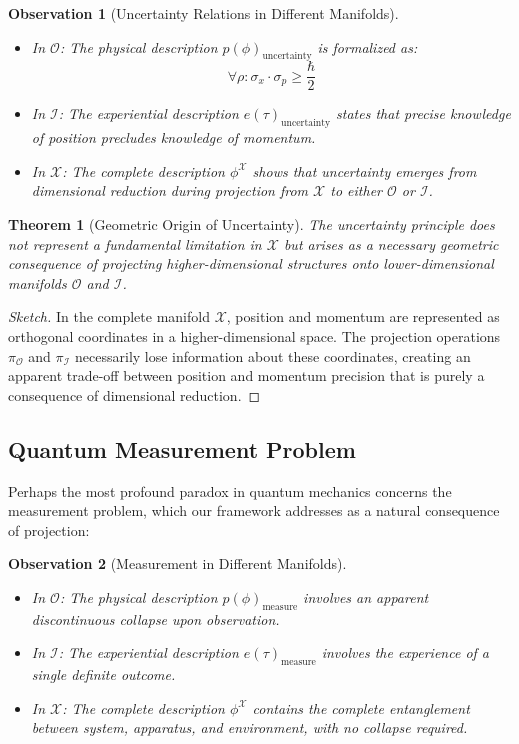 \documentclass{article}
\newtheorem{theorem}{Theorem}
\newtheorem{observation}{Observation}
\begin{document}
\begin{observation}[Uncertainty Relations in Different Manifolds]
\begin{itemize}
\item In $\mathcal{O}$: The physical description $p(\phi)_\text{uncertainty}$ is formalized as:
\begin{equation}
\forall \rho: \sigma_x \cdot \sigma_p \geq \frac{\hbar}{2}
\end{equation}
\item In $\mathcal{I}$: The experiential description $e(\tau)_\text{uncertainty}$ states that precise knowledge of position precludes knowledge of momentum.
\item In $\mathcal{X}$: The complete description $\phi^{\mathcal{X}}$ shows that uncertainty emerges from dimensional reduction during projection from $\mathcal{X}$ to either $\mathcal{O}$ or $\mathcal{I}$.
\end{itemize}
\end{observation}

\begin{theorem}[Geometric Origin of Uncertainty]
The uncertainty principle does not represent a fundamental limitation in $\mathcal{X}$ but arises as a necessary geometric consequence of projecting higher-dimensional structures onto lower-dimensional manifolds $\mathcal{O}$ and $\mathcal{I}$.
\end{theorem}

\begin{proof}[Sketch]
In the complete manifold $\mathcal{X}$, position and momentum are represented as orthogonal coordinates in a higher-dimensional space. The projection operations $\pi_{\mathcal{O}}$ and $\pi_{\mathcal{I}}$ necessarily lose information about these coordinates, creating an apparent trade-off between position and momentum precision that is purely a consequence of dimensional reduction.
\end{proof}

\subsection{Quantum Measurement Problem}

Perhaps the most profound paradox in quantum mechanics concerns the measurement problem, which our framework addresses as a natural consequence of projection:

\begin{observation}[Measurement in Different Manifolds]
\begin{itemize}
\item In $\mathcal{O}$: The physical description $p(\phi)_\text{measure}$ involves an apparent discontinuous collapse upon observation.
\item In $\mathcal{I}$: The experiential description $e(\tau)_\text{measure}$ involves the experience of a single definite outcome.
\item In $\mathcal{X}$: The complete description $\phi^{\mathcal{X}}$ contains the complete entanglement between system, apparatus, and environment, with no collapse required.
\end{itemize}
\end{observation}
\end{document}
